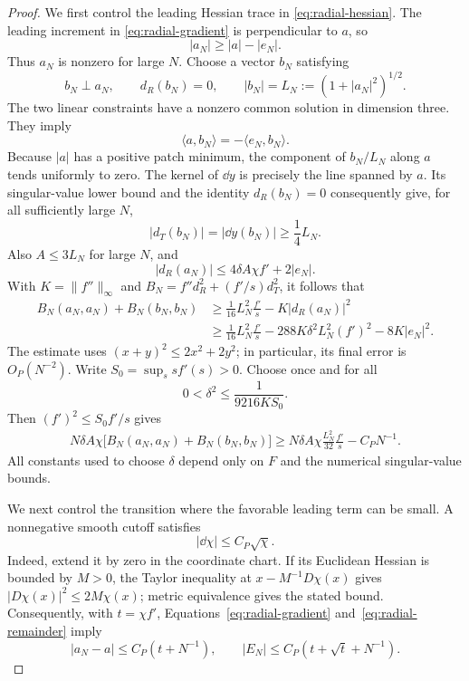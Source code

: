 \begin{proof}
We first control the leading Hessian trace in
\eqref{eq:radial-hessian}.  The leading increment in
\eqref{eq:radial-gradient} is perpendicular to $a$, so
\[
 |a_N|\ge |a|-|e_N|.
\]
Thus $a_N$ is nonzero for large $N$.  Choose a vector $b_N$ satisfying
\[
 b_N\perp a_N,\qquad d_R(b_N)=0,\qquad
 |b_N|=L_N:=(1+|a_N|^2)^{1/2}.
\]
The two linear constraints have a nonzero common solution in dimension
three.  They imply
\[
 \langle a,b_N\rangle=-\langle e_N,b_N\rangle.
\]
Because $|a|$ has a positive patch minimum, the component of $b_N/L_N$
along $a$ tends uniformly to zero.  The kernel of $\dd y$ is precisely
the line spanned by $a$.  Its singular-value lower bound and the identity
$d_R(b_N)=0$ consequently give, for all sufficiently large $N$,
\[
 |d_T(b_N)|=|\dd y(b_N)|\ge\frac14 L_N.
\]
Also $A\le3L_N$ for large $N$, and
\[
 |d_R(a_N)|\le4\delta A\chi f'+2|e_N|.
\]
With $K=\|f''\|_\infty$ and
$B_N=f''d_R^2+(f'/s)d_T^2$, it follows that
\begin{align*}
 B_N(a_N,a_N)+B_N(b_N,b_N)
 &\ge\frac1{16}L_N^2\frac{f'}s-K|d_R(a_N)|^2\\
 &\ge\frac1{16}L_N^2\frac{f'}s
       -288K\delta^2L_N^2(f')^2-8K|e_N|^2.
\end{align*}
The estimate uses $(x+y)^2\le2x^2+2y^2$; in particular, its final error is
$O_P(N^{-2})$.  Write $S_0=\sup_s sf'(s)>0$.  Choose once and for all
\[
 0<\delta^2\le\frac1{9216KS_0}.
\]
Then $(f')^2\le S_0 f'/s$ gives
\begin{equation}
 \begin{split}
 N\delta A\chi
   \bigl[B_N(a_N,a_N)+B_N(b_N,b_N)\bigr]
 \ge N\delta A\chi\frac{L_N^2}{32}\frac{f'}s
       -C_P N^{-1}.
 \end{split}
 \label{eq:radial-leading-trace}
\end{equation}
All constants used to choose $\delta$ depend only on $F$ and the
numerical singular-value bounds.

We next control the transition where the favorable leading term can be
small.  A nonnegative smooth cutoff satisfies
\[
 |\dd\chi|\le C_P\sqrt\chi.
\]
Indeed, extend it by zero in the coordinate chart.  If its Euclidean
Hessian is bounded by $M>0$, the Taylor inequality at
$x-M^{-1}D\chi(x)$ gives
$|D\chi(x)|^2\le2M\chi(x)$; metric equivalence gives the stated bound.
Consequently, with $t=\chi f'$, Equations~\eqref{eq:radial-gradient}
and~\eqref{eq:radial-remainder} imply
\begin{equation}
 |a_N-a|\le C_P(t+N^{-1}),\qquad
 |E_N|\le C_P(t+\sqrt t+N^{-1}).
 \label{eq:radial-small-product}
\end{equation}


\end{proof}
